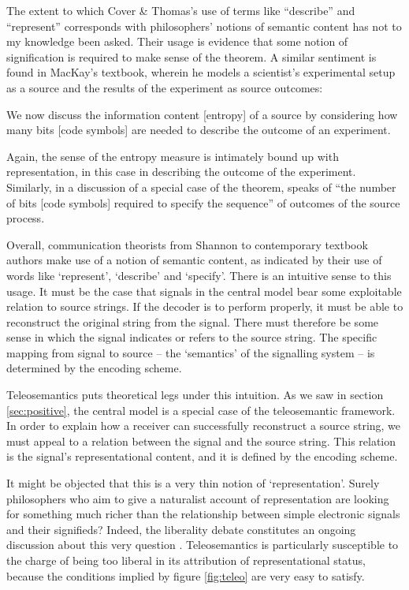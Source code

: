 \documentclass[12pt]{article}
\begin{document}
\noindent The extent to which Cover \& Thomas's use of terms like ``describe'' and ``represent'' corresponds with philosophers' notions of semantic content has not to my knowledge been asked.
Their usage is evidence that some notion of signification is required to make sense of the theorem.
A similar sentiment is found in MacKay's textbook, wherein he models a scientist's experimental setup as a source and the results of the experiment as source outcomes:

\begin{myquote}
We now discuss the information content [entropy] of a source by considering how many bits [code symbols] are needed to describe the outcome of an experiment.
\par\hspace*{\fill}\citet[73]{mackay2003information}
\end{myquote}

\noindent Again, the sense of the entropy measure is intimately bound up with representation, in this case in describing the outcome of the experiment.
Similarly, in a discussion of a special case of the theorem, \citet[397]{shannon1948mathematicalc} speaks of ``the number of bits [code symbols] required to specify the sequence'' of outcomes of the source process.

Overall, communication theorists from Shannon to contemporary textbook authors make use of a notion of semantic content, as indicated by their use of words like `represent', `describe' and `specify'.
There is an intuitive sense to this usage.
It must be the case that signals in the central model bear some exploitable relation to source strings.
If the decoder is to perform properly, it must be able to reconstruct the original string from the signal.
There must therefore be some sense in which the signal indicates or refers to the source string.
The specific mapping from signal to source -- the `semantics' of the signalling system -- is determined by the encoding scheme.

Teleosemantics puts theoretical legs under this intuition.
As we saw in section \ref{sec:positive}, the central model is a special case of the teleosemantic framework.
In order to explain how a receiver can successfully reconstruct a source string, we must appeal to a relation between the signal and the source string.
This relation is the signal's representational content, and it is defined by the encoding scheme.

It might be objected that this is a very thin notion of `representation'.
Surely philosophers who aim to give a naturalist account of representation are looking for something much richer than the relationship between simple electronic signals and their signifieds?
Indeed, the liberality debate constitutes an ongoing discussion about this very question \citep{artiga2016liberal,artiga2022strong,desouzafilho2022dual}.
Teleosemantics is particularly susceptible to the charge of being too liberal in its attribution of representational status, because the conditions implied by figure \ref{fig:teleo} are very easy to satisfy.
\end{document}
